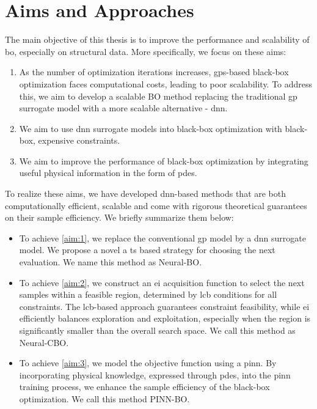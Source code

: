 \section{Aims and Approaches}
The main objective of this thesis is to improve the performance and scalability of \acl{bo}, especially on structural data.  More specifically, we focus on these aims:
\begin{enumerate}[label= Aim \arabic*, align=left]
    \item As the number of optimization iterations increases, \acp{gp}-based black-box optimization faces computational costs, leading to poor scalability. To address this, we aim to develop a scalable BO method replacing the traditional \ac{gp} surrogate model with a more scalable alternative - \ac{dnn}. \label{aim:1}
    \item We aim to use \ac{dnn} surrogate models into black-box optimization with black-box, expensive constraints.  \label{aim:2}
    \item We aim to improve the performance of black-box optimization by integrating useful physical information in the form of \acfp{pde}. \label{aim:3}
\end{enumerate}
To realize these aims, we have developed \ac{dnn}-based methods that are both computationally efficient, scalable and come with rigorous theoretical guarantees on their sample efficiency. We briefly summarize them below:
\begin{itemize}
    \item To achieve \ref{aim:1}, we replace the conventional \ac{gp} model by a \ac{dnn} surrogate model. We propose a novel a \acl{ts} based strategy for choosing the next evaluation. We name this method as Neural-BO.
    \item To achieve \ref{aim:2}, we construct an \acf{ei} acquisition function to select the next samples within a feasible region, determined by \acf{lcb} conditions for all constraints. The \acs{lcb}-based approach guarantees constraint feasibility, while \acs{ei} efficiently balances exploration and exploitation, especially when the region is significantly smaller than the overall search space. We call this method as Neural-CBO.
    \item To achieve \ref{aim:3}, we model the objective function using a \acf{pinn}. By incorporating physical knowledge, expressed through \acp{pde}, into the \ac{pinn} training process, we enhance the sample efficiency of the black-box optimization.  We call this method PINN-BO. 
\end{itemize}
